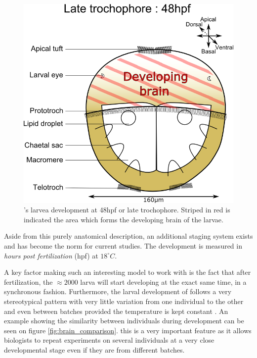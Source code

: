 \begin{figure}[bth]
\begin{center}
  \includegraphics[width=0.6\linewidth]{gfx/chapter1/larvae48hpf.png}
\end{center}
  \caption{\platyfull{}'s larvea development at 48hpf or late trochophore. Striped in red is indicated the area which forms the developing brain of the larvae.}
  \label{fig:platynereis_larvae_scheme}
\end{figure}
    
    Aside from this purely anatomical description, an additional staging system exists and has become the norm for current studies. The development is measured in \textit{hours post fertilization} (hpf) at $18^{\circ}C$.
    
    A key factor making \platy{} such an interesting model to work with is the fact that after fertilization, the $\approx 2000$ larva will start developing at the exact same time, in a synchronous fashion. Furthermore, the larval development of \platy{} follows a very stereotypical pattern with very little variation from one individual to the other and even between batches provided the temperature is kept constant \cite{fischer04,dorresteijn90}. An example showing the similarity between individuals during development can be seen on figure \ref{fig:brain_comparison}. this is a very important feature as it allows biologists to repeat experiments on several individuals at a very close developmental stage even if they are from different batches.\\
    
